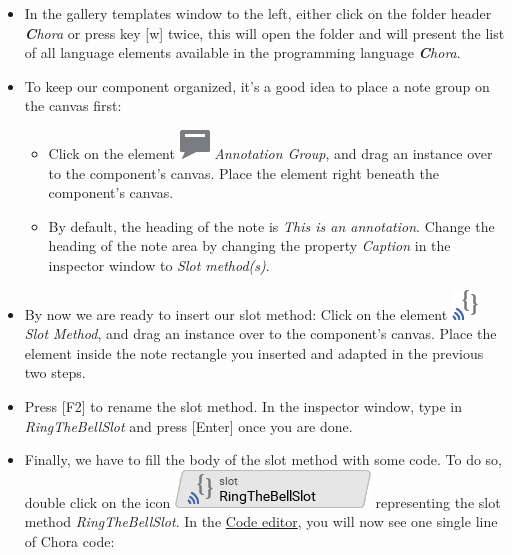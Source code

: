 \documentclass[
  a4paper,
,tablecaptionabove
]{scrbook}
\begin{document}
\begin{itemize}
\item
  In the gallery templates window to the left, either click on the
  folder header \emph{\textbf{C}hora} or press key {[}w{]} twice,
  this will open the folder and will present the list of all language
  elements available in the programming language \emph{\textbf{C}hora}.
\item
  To keep our component organized, it's a good idea to place a note
  group on the canvas first:

  \begin{itemize}
  \item
    Click on the element
    \includegraphics{./../asciidoc/modules/ROOT/assets/images/icons/AnnotationGroupIcon.png}
    \emph{Annotation Group}, and drag an instance over to the
    component's canvas. Place the element right beneath the component's
    canvas.
  \item
    By default, the heading of the note is \emph{This is an annotation}.
    Change the heading of the note area by changing the property
    \emph{Caption} in the inspector window to \emph{Slot method(s)}.
  \end{itemize}
\item
  By now we are ready to insert our slot method: Click on the element
  \includegraphics{./../asciidoc/modules/ROOT/assets/images/icons/SlotMethodIcon.png}
  \emph{Slot Method}, and drag an instance over to the component's
  canvas. Place the element inside the note rectangle you inserted and
  adapted in the previous two steps.
\item
  Press {[}F2{]} to rename the slot method. In the inspector window,
  type in \emph{RingTheBellSlot} and press {[}Enter{]} once you are
  done.
\item
  Finally, we have to fill the body of the slot method with some code.
  To do so, double click on the icon
  \includegraphics{./../asciidoc/modules/ROOT/assets/images/icons/RingTheBellSlotIcon.png}
  representing the slot method \emph{RingTheBellSlot}. In the
  \href{https://doc.embedded-wizard.de/code-editor-window}{Code editor},
  you will now see one single line of Chora code:
\end{itemize}
\end{document}
